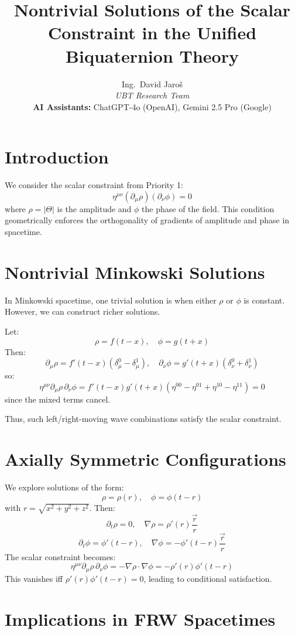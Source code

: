 \documentclass{article}
\title{Nontrivial Solutions of the Scalar Constraint in the Unified Biquaternion Theory}
\author{
Ing.~David Jaroš \\
\textit{UBT Research Team} \\
\textbf{AI Assistants:} ChatGPT-4o (OpenAI), Gemini 2.5 Pro (Google) \\
}
\date{}
\begin{document}
\maketitle

\section{Introduction}

We consider the scalar constraint from Priority 1:
\[
\eta^{\mu\nu} (\partial_\mu \rho)(\partial_\nu \phi) = 0
\]
where \(\rho = |\Theta|\) is the amplitude and \(\phi\) the phase of the field. This condition geometrically enforces the orthogonality of gradients of amplitude and phase in spacetime.

\section{Nontrivial Minkowski Solutions}

In Minkowski spacetime, one trivial solution is when either \(\rho\) or \(\phi\) is constant. However, we can construct richer solutions.

Let:
\[
\rho = f(t - x), \quad \phi = g(t + x)
\]
Then:
\[
\partial_\mu \rho = f'(t - x)(\delta^0_\mu - \delta^1_\mu), \quad
\partial_\nu \phi = g'(t + x)(\delta^0_\nu + \delta^1_\nu)
\]
so:
\[
\eta^{\mu\nu} \partial_\mu \rho \, \partial_\nu \phi =
f'(t - x)g'(t + x) (\eta^{00} - \eta^{01} + \eta^{10} - \eta^{11}) = 0
\]
since the mixed terms cancel.

Thus, such left/right-moving wave combinations satisfy the scalar constraint.

\section{Axially Symmetric Configurations}

We explore solutions of the form:
\[
\rho = \rho(r), \quad \phi = \phi(t - r)
\]
with \(r = \sqrt{x^2 + y^2 + z^2}\). Then:
\[
\partial_t \rho = 0, \quad \nabla \rho = \rho'(r) \frac{\vec{r}}{r}
\]
\[
\partial_t \phi = \phi'(t - r), \quad \nabla \phi = -\phi'(t - r)\frac{\vec{r}}{r}
\]
The scalar constraint becomes:
\[
\eta^{\mu\nu} \partial_\mu \rho \, \partial_\nu \phi = -\nabla \rho \cdot \nabla \phi = -\rho'(r)\phi'(t - r)
\]
This vanishes iff \(\rho'(r)\phi'(t - r) = 0\), leading to conditional satisfaction.

\section{Implications in FRW Spacetimes}
\end{document}
